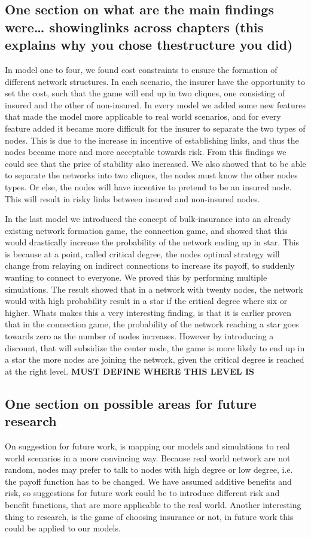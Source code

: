 \subsection{One section on what are the main findings were… showinglinks across chapters (this explains why you chose thestructure you did)}
In model one to four, we found cost constraints to ensure the formation of different network structures. In each scenario, the insurer have the opportunity to set the cost, such that the game will end up in two cliques, one consisting of insured and the other of non-insured. 
In every model we added some new features that made the model more applicable to real world scenarios, and for every feature added it became more difficult for the insurer to separate the two types of nodes. This is due to the increase in incentive of establishing links, and thus the nodes became more and more acceptable towards risk. From this findings we could see that the price of stability also increased. 
We also showed that to be able to separate the networks into two cliques, the nodes must know the other nodes types. Or else, the nodes will have incentive to pretend to be an insured node. This will result in risky links between insured and non-insured nodes. 

In the last model we introduced the concept of bulk-insurance into an already existing network formation game, the connection game, and showed that this would drastically increase the probability of the network ending up in star. This is because at a point, called critical degree, the nodes optimal strategy will change from relaying on indirect connections to increase its payoff, to suddenly wanting to connect to everyone. 
We proved this by performing multiple simulations. The result showed that in a network with twenty nodes, the network would with high probability result in a star if the critical degree where six or higher. 
Whats makes this a very interesting finding, is that it is earlier proven that in the connection game, the probability of the network reaching a star goes towards zero as the number of nodes increases. However by introducing a discount, that will subsidize the center node, the game is more likely to end up in a star the more nodes are joining the network, given the critical degree is reached at the right level. \textbf{MUST DEFINE WHERE THIS LEVEL IS}

\subsection{One section on possible areas for future research}
On suggestion for future work, is mapping our models and simulations to real world scenarios in a more convincing way. Because real world network are not random, nodes may prefer to talk to nodes with high degree or low degree, i.e. the payoff function has to be changed. We have assumed additive benefits and risk, so suggestions for future work could be to introduce different risk and benefit functions, that are more applicable to the real world. 
Another interesting thing to research, is the game of choosing insurance or not, in future work this could be applied to our models.
 
